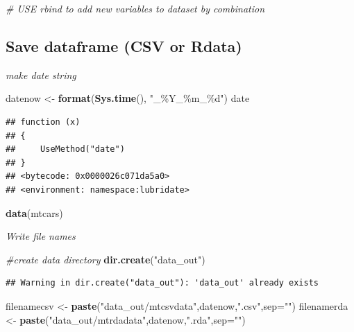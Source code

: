 \documentclass[
]{article}
\newenvironment{Shaded}{\begin{snugshade}}{\end{snugshade}}
\newcommand{\AttributeTok}[1]{\textcolor[rgb]{0.13,0.29,0.53}{#1}}
\newcommand{\CommentTok}[1]{\textcolor[rgb]{0.56,0.35,0.01}{\textit{#1}}}
\newcommand{\FunctionTok}[1]{\textcolor[rgb]{0.13,0.29,0.53}{\textbf{#1}}}
\newcommand{\NormalTok}[1]{#1}
\newcommand{\OtherTok}[1]{\textcolor[rgb]{0.56,0.35,0.01}{#1}}
\newcommand{\StringTok}[1]{\textcolor[rgb]{0.31,0.60,0.02}{#1}}
\begin{document}
\begin{Shaded}
\begin{Highlighting}[]
\CommentTok{\# USE rbind to add new variables to dataset by combination}
\end{Highlighting}
\end{Shaded}

\hypertarget{save-dataframe-csv-or-rdata}{%
\subsection{Save dataframe (CSV or Rdata)}\label{save-dataframe-csv-or-rdata}}

\emph{make date string}

\begin{Shaded}
\begin{Highlighting}[]
\NormalTok{datenow }\OtherTok{\textless{}{-}} \FunctionTok{format}\NormalTok{(}\FunctionTok{Sys.time}\NormalTok{(), }\StringTok{"\_\%Y\_\%m\_\%d"}\NormalTok{)}
\NormalTok{date}
\end{Highlighting}
\end{Shaded}

\begin{verbatim}
## function (x) 
## {
##     UseMethod("date")
## }
## <bytecode: 0x0000026c071da5a0>
## <environment: namespace:lubridate>
\end{verbatim}

\begin{Shaded}
\begin{Highlighting}[]
\FunctionTok{data}\NormalTok{(mtcars)}
\end{Highlighting}
\end{Shaded}

\emph{Write file names}

\begin{Shaded}
\begin{Highlighting}[]
\CommentTok{\#create data directory}
\FunctionTok{dir.create}\NormalTok{(}\StringTok{"data\_out"}\NormalTok{)}
\end{Highlighting}
\end{Shaded}

\begin{verbatim}
## Warning in dir.create("data_out"): 'data_out' already exists
\end{verbatim}

\begin{Shaded}
\begin{Highlighting}[]
\NormalTok{filenamecsv }\OtherTok{\textless{}{-}} \FunctionTok{paste}\NormalTok{(}\StringTok{"data\_out/mtcsvdata"}\NormalTok{,datenow,}\StringTok{".csv"}\NormalTok{,}\AttributeTok{sep=}\StringTok{""}\NormalTok{)}
\NormalTok{filenamerda }\OtherTok{\textless{}{-}} \FunctionTok{paste}\NormalTok{(}\StringTok{"data\_out/mtrdadata"}\NormalTok{,datenow,}\StringTok{".rda"}\NormalTok{,}\AttributeTok{sep=}\StringTok{""}\NormalTok{)}
\end{Highlighting}
\end{Shaded}
\end{document}

